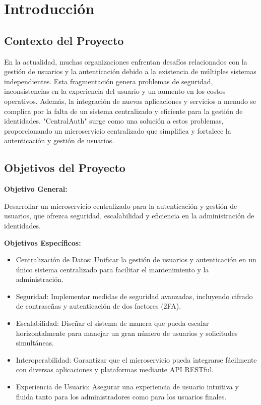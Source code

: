\section{Introducción}

\subsection{Contexto del Proyecto}

En la actualidad, muchas organizaciones enfrentan desafíos relacionados con la gestión de usuarios y la autenticación debido a la existencia de múltiples sistemas independientes. Esta fragmentación genera problemas de seguridad, inconsistencias en la experiencia del usuario y un aumento en los costos operativos. Además, la integración de nuevas aplicaciones y servicios a menudo se complica por la falta de un sistema centralizado y eficiente para la gestión de identidades. "CentralAuth" surge como una solución a estos problemas, proporcionando un microservicio centralizado que simplifica y fortalece la autenticación y gestión de usuarios.

\subsection{Objetivos del Proyecto}

\textbf{Objetivo General:}

Desarrollar un microservicio centralizado para la autenticación y gestión de usuarios, que ofrezca seguridad, escalabilidad y eficiencia en la administración de identidades.

\textbf{Objetivos Específicos:}

\begin{itemize}
    \item Centralización de Datos: Unificar la gestión de usuarios y autenticación en un único sistema centralizado para facilitar el mantenimiento y la administración.
    \item Seguridad: Implementar medidas de seguridad avanzadas, incluyendo cifrado de contraseñas y autenticación de dos factores (2FA).
    \item Escalabilidad: Diseñar el sistema de manera que pueda escalar horizontalmente para manejar un gran número de usuarios y solicitudes simultáneas.
    \item Interoperabilidad: Garantizar que el microservicio pueda integrarse fácilmente con diversas aplicaciones y plataformas mediante API RESTful.
    \item Experiencia de Usuario: Asegurar una experiencia de usuario intuitiva y fluida tanto para los administradores como para los usuarios finales.
\end{itemize}

